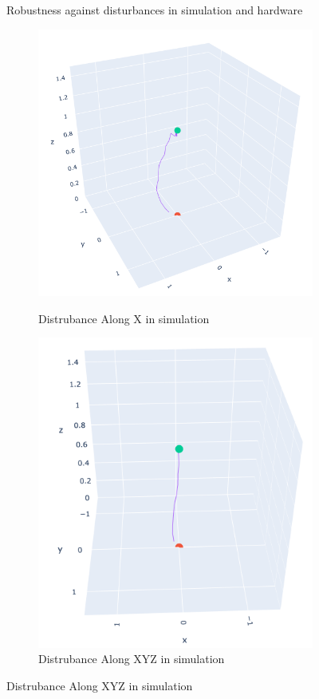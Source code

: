 \documentclass[../templateLTHtwocol.tex]{subfiles}
\begin{document}
\begin{figure}[H]
	\centering
	\caption{3D trajectories against disturbances for final model}
	{Robustness against disturbances in simulation and hardware}
	\begin{subfigure}[b]{0.25\textwidth}
		\caption{Distrubance Along X in simulation}
		\includegraphics[width=\textwidth]{resources/final_model/3d-dist_x_001.png}
		\label{final_x:fig}
	\end{subfigure}
	\hfill
	\begin{subfigure}[b]{0.25\textwidth}
		\caption{Distrubance Along XYZ in simulation}
		\includegraphics[width=\textwidth]{resources/final_model/3d-dist_xyz_005.png}

\end{subfigure}
\end{figure}
\end{document}
